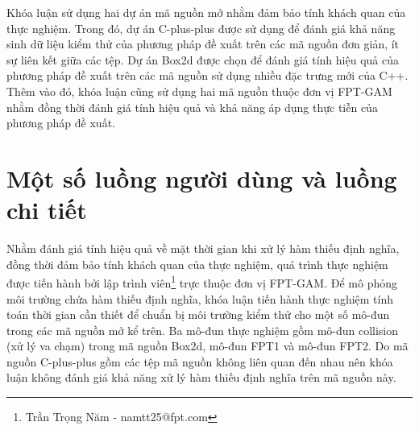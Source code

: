 Khóa luận sử dụng hai dự án mã nguồn mở nhằm đảm bảo tính khách quan của thực nghiệm. Trong đó, dự án C-plus-plus được sử dụng để đánh giá khả năng sinh dữ liệu kiểm thử của phương pháp đề xuất trên các mã nguồn đơn giản, ít sự liên kết giữa các tệp. Dự án Box2d được chọn để đánh giá tính hiệu quả của phương pháp đề xuất trên các mã nguồn sử dụng nhiều đặc trưng mới của C++. Thêm vào đó, khóa luận cũng sử dụng hai mã nguồn thuộc đơn vị FPT-GAM nhằm đồng thời đánh giá tính hiệu quả và khả năng áp dụng thực tiễn của phương pháp đề xuất.

\section{Một số luồng người dùng và luồng chi tiết}\label{sec:user-flow-examples}
Nhằm đánh giá tính hiệu quả về mặt thời gian khi xử lý hàm thiếu định nghĩa, đồng thời đảm bảo tính khách quan của thực nghiệm, quá trình thực nghiệm được tiến hành bởi lập trình viên\footnote{Trần Trọng Năm - namtt25@fpt.com} trực thuộc đơn vị FPT-GAM. Để mô phỏng môi trường chứa hàm thiếu định nghĩa, khóa luận tiến hành thực nghiệm tính toán thời gian cần thiết để chuẩn bị môi trường kiểm thử cho một số mô-đun trong các mã nguồn mở kể trên. Ba mô-đun thực nghiệm gồm mô-đun collision (xử lý va chạm) trong mã nguồn Box2d, mô-đun FPT1 và mô-đun FPT2. Do mã nguồn C-plus-plus gồm các tệp mã nguồn không liên quan đến nhau nên khóa luận không đánh giá khả năng xử lý hàm thiếu định nghĩa trên mã nguồn này.

